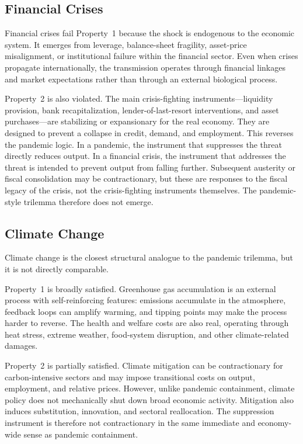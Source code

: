\documentclass[12pt, a4paper]{article}
\begin{document}
\subsection*{Financial Crises}

Financial crises fail Property~1 because the shock is endogenous to the economic system. It emerges from leverage, balance-sheet fragility, asset-price misalignment, or institutional failure within the financial sector. Even when crises propagate internationally, the transmission operates through financial linkages and market expectations rather than through an external biological process.

Property~2 is also violated. The main crisis-fighting instruments---liquidity provision, bank recapitalization, lender-of-last-resort interventions, and asset purchases---are stabilizing or expansionary for the real economy. They are designed to prevent a collapse in credit, demand, and employment. This reverses the pandemic logic. In a pandemic, the instrument that suppresses the threat directly reduces output. In a financial crisis, the instrument that addresses the threat is intended to prevent output from falling further. Subsequent austerity or fiscal consolidation may be contractionary, but these are responses to the fiscal legacy of the crisis, not the crisis-fighting instruments themselves. The pandemic-style trilemma therefore does not emerge.

\subsection*{Climate Change}

Climate change is the closest structural analogue to the pandemic trilemma, but it is not directly comparable.

Property~1 is broadly satisfied. Greenhouse gas accumulation is an external process with self-reinforcing features: emissions accumulate in the atmosphere, feedback loops can amplify warming, and tipping points may make the process harder to reverse. The health and welfare costs are also real, operating through heat stress, extreme weather, food-system disruption, and other climate-related damages.

Property~2 is partially satisfied. Climate mitigation can be contractionary for carbon-intensive sectors and may impose transitional costs on output, employment, and relative prices. However, unlike pandemic containment, climate policy does not mechanically shut down broad economic activity. Mitigation also induces substitution, innovation, and sectoral reallocation. The suppression instrument is therefore not contractionary in the same immediate and economy-wide sense as pandemic containment.
\end{document}
